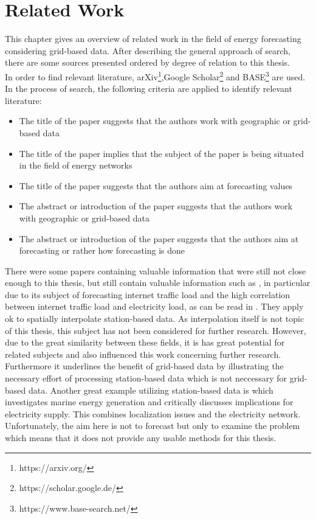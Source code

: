 \chapter{Related Work}
\label{ch:RW}

This chapter gives an overview of related work in the field of energy forecasting considering grid-based data. After describing the general approach of search, there are some sources presented ordered by degree of relation to this thesis.\\

In order to find relevant literature, arXiv\footnote{https://arxiv.org/},Google Scholar\footnote{https://scholar.google.de/} and BASE\footnote{https://www.base-search.net/} are used.\\
In the process of search, the following criteria are applied to identify relevant literature:
\begin{itemize}
  \item The title of the paper suggests that the authors work with geographic or grid-based data
  \item The title of the paper implies that the subject of the paper is being situated in the field of energy networks
  \item The title of the paper suggests that the authors aim at forecasting values
  \item The abstract or introduction of the paper suggests that the authors work with geographic or grid-based data
  \item The abstract or introduction of the paper suggests that the authors aim at forecasting or rather how forecasting is done
\end{itemize}

There were some papers containing valuable information that were still not close enough to this thesis, but still contain valuable information such as , in particular due to its subject of forecasting internet traffic load and the high correlation between internet traffic load and electricity load, as can be read in . They apply \gls{ok} to spatially interpolate station-based data. As interpolation itself is not topic of this thesis, this subject has not been considered for further research. However, due to the great similarity between these fields, it is has great potential for related subjects and also influenced this work \eg concerning further research. Furthermore it underlines the benefit of grid-based data by illustrating the necessary effort of processing station-based data which is not neccessary for grid-based data. Another great example utilizing station-based data is  which investigates marine energy generation and critically discusses implications for electricity supply. This combines localization issues and the electricity network. Unfortunately, the aim here is not to forecast but only to examine the problem which means that it does not provide any usable methods for this thesis.\\

